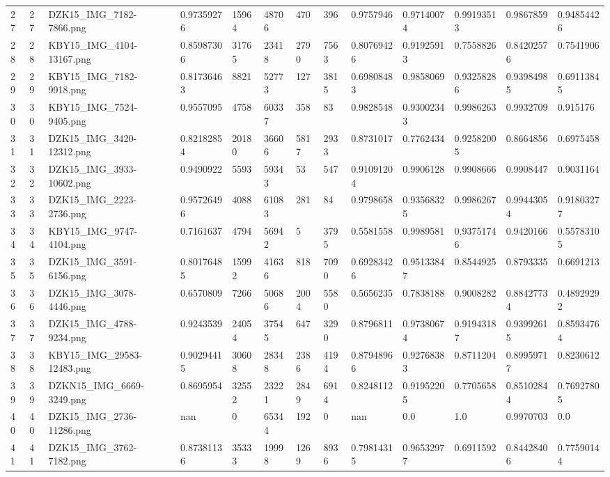 \documentclass[11pt, a4paper, twoside]{report}
\begin{document}
\begin{longtable}[c]{@{}lllllllllllll@{}}
27 & 27 & DZK15\_IMG\_7182-7866.png & 0.97359276 & 15964 & 48706 & 470 & 396 & 0.9757946 & 0.97140074 & 0.99193513 & 0.9867859 & 0.94854426 \\
28 & 28 & KBY15\_IMG\_4104-13167.png & 0.85987306 & 31765 & 23418 & 2790 & 7563 & 0.80769426 & 0.91925913 & 0.7558826 & 0.84202576 & 0.7541906 \\
29 & 29 & KBY15\_IMG\_7182-9918.png & 0.81736463 & 8821 & 52773 & 127 & 3815 & 0.69808483 & 0.9858069 & 0.93258286 & 0.93984985 & 0.69113845 \\
30 & 30 & KBY15\_IMG\_7524-9405.png & 0.9557095 & 4758 & 60337 & 358 & 83 & 0.9828548 & 0.93002343 & 0.9986263 & 0.9932709 & 0.915176 \\
31 & 31 & DZK15\_IMG\_3420-12312.png & 0.82182854 & 20180 & 36606 & 5817 & 2933 & 0.8731017 & 0.7762434 & 0.92582005 & 0.8664856 & 0.6975458 \\
32 & 32 & DZK15\_IMG\_3933-10602.png & 0.9490922 & 5593 & 59343 & 53 & 547 & 0.91091204 & 0.9906128 & 0.9908666 & 0.9908447 & 0.9031164 \\
33 & 33 & DZK15\_IMG\_2223-2736.png & 0.95726496 & 4088 & 61083 & 281 & 84 & 0.9798658 & 0.93568325 & 0.9986267 & 0.99443054 & 0.91803277 \\
34 & 34 & KBY15\_IMG\_9747-4104.png & 0.7161637 & 4794 & 56942 & 5 & 3795 & 0.5581558 & 0.9989581 & 0.93751746 & 0.9420166 & 0.55783105 \\
35 & 35 & DZK15\_IMG\_3591-6156.png & 0.80176485 & 15992 & 41636 & 818 & 7090 & 0.69283426 & 0.95133847 & 0.8544925 & 0.8793335 & 0.6691213 \\
36 & 36 & DZK15\_IMG\_3078-4446.png & 0.6570809 & 7266 & 50686 & 2004 & 5580 & 0.5656235 & 0.7838188 & 0.9008282 & 0.88427734 & 0.48929292 \\
37 & 37 & DZK15\_IMG\_4788-9234.png & 0.9243539 & 24054 & 37545 & 647 & 3290 & 0.8796811 & 0.97380674 & 0.91943187 & 0.93992615 & 0.85934764 \\
38 & 38 & KBY15\_IMG\_29583-12483.png & 0.90294415 & 30608 & 28348 & 2386 & 4194 & 0.87948966 & 0.92768383 & 0.8711204 & 0.89959717 & 0.8230612 \\
39 & 39 & DZKN15\_IMG\_6669-3249.png & 0.8695954 & 32552 & 23221 & 2849 & 6914 & 0.8248112 & 0.91952205 & 0.7705658 & 0.85102844 & 0.76927805 \\
40 & 40 & DZK15\_IMG\_2736-11286.png & nan & 0 & 65344 & 192 & 0 & nan & 0.0 & 1.0 & 0.9970703 & 0.0 \\
41 & 41 & DZK15\_IMG\_3762-7182.png & 0.87381136 & 35333 & 19998 & 1269 & 8936 & 0.79814315 & 0.96532977 & 0.6911592 & 0.84428406 & 0.77590144 \\

\end{longtable}
\end{document}

